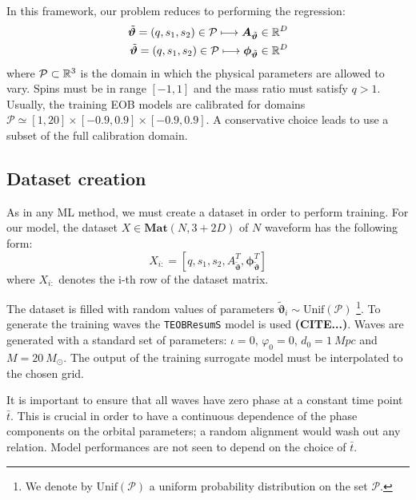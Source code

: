 \par
In this framework, our problem reduces to performing the regression:
\begin{align}
	{\tilde{\boldsymbol{\vartheta}}} = (q, s_1, s_2) \in \mathcal{P} \longmapsto \boldsymbol{A}_{{\tilde{\boldsymbol{\vartheta}}}} \in \mathbb{R}^D \\
	{\tilde{\boldsymbol{\vartheta}}} = (q, s_1, s_2) \in \mathcal{P} \longmapsto \boldsymbol{\phi}_{{\tilde{\boldsymbol{\vartheta}}}} \in \mathbb{R}^D 
\end{align}
where $\mathcal{P} \subset \mathbb{R}^3$ is the domain in which the physical parameters are allowed to vary.
Spins must be in range $[-1,1]$ and the mass ratio must satisfy $q>1$.
Usually, the training EOB models are calibrated for domains $\mathcal{P} \simeq [1,20]\times[-0.9,0.9]\times[-0.9,0.9]$. A conservative choice leads to use a subset of the full calibration domain.

\subsection{Dataset creation}
As in any ML method, we must create a dataset in order to perform training.
For our model, the dataset ${X \in \mathbf{Mat}(N,3+2D)}$ of $N$ waveform has the following form:
\begin{equation} \label{eq:dataset}
	X_{i:} = [q,s_1,s_2, {A}_{{\tilde{\boldsymbol{\vartheta}}}}^T, \boldsymbol{\phi}_{{\tilde{\boldsymbol{\vartheta}}}}^T]
\end{equation}
where $X_{i:}$ denotes the i-th row of the dataset matrix.
\par
The dataset is filled with random values of parameters ${\tilde{\boldsymbol{\vartheta}}}_i \sim \textrm{Unif}(\mathcal{P})$
\footnote{We denote by $\textrm{Unif}(\mathcal{P})$ a uniform probability distribution on the set $\mathcal{P}$.}.
To generate the training waves the \texttt{TEOBResumS} model is used \textbf{(CITE...)}.
Waves are generated with a standard set of parameters: $\iota =0 $, $\varphi_0 = 0$, $d_0 = \SI{1}{Mpc}$ and $M = \SI{20}{M_\odot}$.
The output of the training surrogate model must be interpolated to the chosen grid.
\par
It is important to ensure that all waves have zero phase at a constant time point $\bar{t}$. This is crucial in order to have a continuous dependence of the phase components on the orbital parameters; a random alignment would wash out any relation. Model performances are not seen to depend on the choice of $\bar{t}$.
